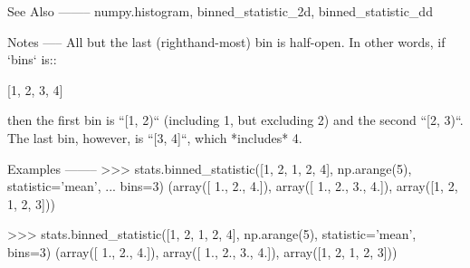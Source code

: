 \begin{DoxyVerb}
See Also
--------
numpy.histogram, binned_statistic_2d, binned_statistic_dd

Notes
-----
All but the last (righthand-most) bin is half-open.  In other words, if
`bins` is::

  [1, 2, 3, 4]

then the first bin is ``[1, 2)`` (including 1, but excluding 2) and the
second ``[2, 3)``.  The last bin, however, is ``[3, 4]``, which *includes*
4.

Examples
--------
>>> stats.binned_statistic([1, 2, 1, 2, 4], np.arange(5), statistic='mean',
... bins=3)
(array([ 1.,  2.,  4.]), array([ 1.,  2.,  3.,  4.]), array([1, 2, 1, 2, 3]))

>>> stats.binned_statistic([1, 2, 1, 2, 4], np.arange(5), statistic='mean', bins=3)
(array([ 1.,  2.,  4.]), array([ 1.,  2.,  3.,  4.]), array([1, 2, 1, 2, 3]))\end{DoxyVerb}
 \hypertarget{namespacescipy_1_1stats_1_1__binned__statistic_aa6e4a8ca8657a2ca112d234343e53e41}{}
